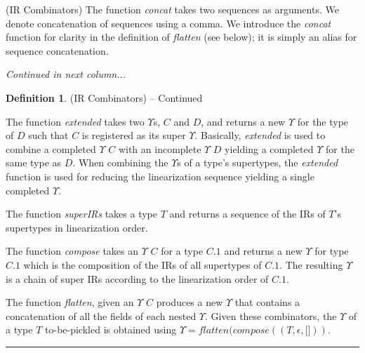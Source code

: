 \documentclass[10pt]{sigplanconf}
\theoremstyle{definition}
\theoremstyle{definition}
\newtheorem*{defn*}{Definition}
\begin{document}
\begin{defn}{(IR Combinators)}
The function \textit{concat} takes two sequences as arguments. We
denote concatenation of sequences using a comma. We introduce the
\textit{concat} function for clarity in the definition of \textit{flatten}
(see below); it is simply an alias for sequence concatenation.

\vspace{1em}
\textit{Continued in next column...}
\vspace{1em}

\end{defn}




\begin{defn*}{(IR Combinators) -- Continued}


\vspace{0.4cm}

The function \textit{extended} takes two $\Upsilon$s, $C$ and $D$, and returns a new
$\Upsilon$ for the type of $D$ such that $C$ is registered as its super $\Upsilon$.
Basically, \textit{extended} is used to combine a completed $\Upsilon$ $C$ with an
incomplete $\Upsilon$ $D$ yielding a completed $\Upsilon$ for the same type as $D$. When
combining the $\Upsilon$s of a type's supertypes, the \textit{extended} function is
used for reducing the linearization sequence yielding a single completed $\Upsilon$.

The function \textit{superIRs} takes a type $T$ and returns a sequence of the
IRs of $T$'s supertypes in linearization order.

The function \textit{compose} takes an $\Upsilon$ $C$ for a type $C.1$ and returns a
new $\Upsilon$ for type $C.1$ which is the composition of the IRs of all supertypes
of $C.1$. The resulting $\Upsilon$ is a chain of super IRs according to the
linearization order of $C.1$.

The function \textit{flatten}, given an $\Upsilon$ $C$ produces a new $\Upsilon$ that
contains a concatenation of all the fields of each nested $\Upsilon$. Given
these combinators, the $\Upsilon$ of a type $T$ to-be-pickled is obtained
using $\Upsilon = flatten(compose((T, \epsilon, \lbrack \rbrack))$.
\end{defn*}

\rule{0.9\columnwidth}{0.7pt}

\vspace{2em}
\end{document}
